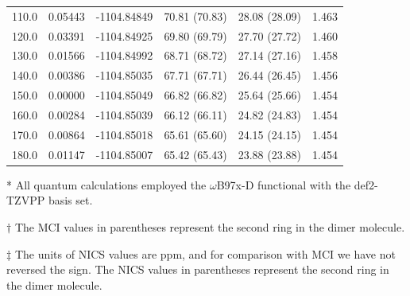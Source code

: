\begin{table}[hbt!]
\begin{threeparttable}
\begin{tabular}{cccccc}
    110.0 & 0.05443 & -1104.84849 & 70.81 (70.83) & 28.08 (28.09) & 1.463 \\
    120.0 & 0.03391 & -1104.84925 & 69.80 (69.79) & 27.70 (27.72) & 1.460 \\
    130.0 & 0.01566 & -1104.84992 & 68.71 (68.72) & 27.14 (27.16) & 1.458 \\
    140.0 & 0.00386 & -1104.85035 & 67.71 (67.71) & 26.44 (26.45) & 1.456 \\
    150.0 & 0.00000 & -1104.85049 & 66.82 (66.82) & 25.64 (25.66) & 1.454 \\
    160.0 & 0.00284 & -1104.85039 & 66.12 (66.11) & 24.82 (24.83) & 1.454 \\
    170.0 & 0.00864 & -1104.85018 & 65.61 (65.60) & 24.15 (24.15) & 1.454 \\
    180.0 & 0.01147 & -1104.85007 & 65.42 (65.43) & 23.88 (23.88) & 1.454 \\ \bottomrule
\end{tabular}
\begin{tablenotes}
\item[*] \footnotesize All quantum calculations employed the $\omega$B97x-D functional with the def2-TZVPP basis set.
\item [$\dagger$] \footnotesize The MCI values in parentheses represent the second ring in the dimer molecule.
\item [$\ddagger$] \footnotesize The units of NICS values are ppm, and for comparison with MCI we have not reversed the sign. The NICS values in parentheses represent the second ring in the dimer molecule.
\end{tablenotes}
\end{threeparttable}
\end{table}

